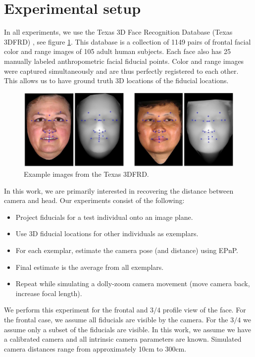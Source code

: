 \documentclass[runningheads]{llncs}
\begin{document}
\section{Experimental setup}
In all experiments, we use the Texas 3D Face Recognition Database (Texas 3DFRD) \cite{gupta2010texas}, see figure \ref{fig:t3dfrd}.  
This database is a collection of 1149 pairs of frontal facial color and range images of 105 adult human subjects.  
Each face also has 25 manually labeled anthropometric facial fiducial points.  
Color and range images were captured simultaneously and are thus perfectly registered to each other.  
This allows us to have ground truth 3D locations of the fiducial locations.  
\begin{figure}[h]
\centering
\includegraphics[width=.7\linewidth]{resources/figures/t3dfr.jpg}
\caption{Example images from the Texas 3DFRD.}
\label{fig:t3dfrd}
\end{figure}
In this work, we are primarily interested in recovering the distance between camera and head.  Our experiments consist of the following:

\begin{itemize}
\item Project fiducials for a test individual onto an image plane.
\item Use 3D fiducial locations for other individuals as exemplars.
\item For each exemplar, estimate the camera pose (and distance) using EPnP.
\item Final estimate is the average from all exemplars.
\item Repeat while simulating a dolly-zoom camera movement (move camera back, increase focal length).  
\end{itemize}

We perform this experiment for the frontal and $3/4$ profile view of the face.  
For the frontal case, we assume all fiducials are visible by the camera.  
For the $3/4$ we assume only a subset of the fiducials are visible. 
In this work, we assume we have a calibrated camera and all intrinsic camera parameters are known.  
Simulated camera distances range from approximately 10cm to 300cm.
\end{document}
